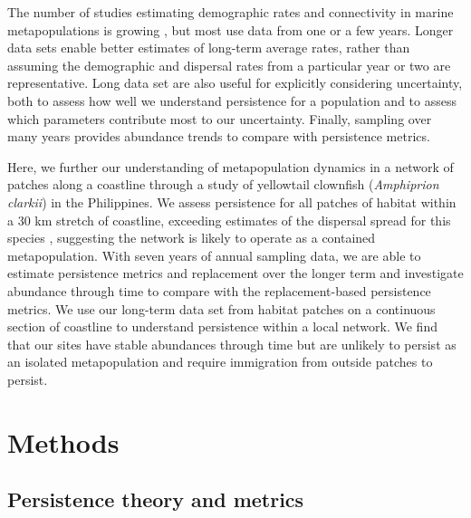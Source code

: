 \documentclass[12pt, oneside]{article}   	%
\begin{document}
The number of studies estimating demographic rates and connectivity in marine metapopulations is growing \citep[e.g.][]{carson2011evaluating, salles_coral_2015, johnson2018integrating, garavelli2018population}, but most use data from one or a few years. Longer data sets enable better estimates of long-term average rates, rather than assuming the demographic and dispersal rates from a particular year or two are representative. Long data set are also useful for explicitly considering uncertainty, both to assess how well we understand persistence for a population and to assess which parameters contribute most to our uncertainty. Finally, sampling over many years provides abundance trends to compare with persistence metrics.


Here, we further our understanding of metapopulation dynamics in a network of patches along a coastline through a study of yellowtail clownfish (\textit{Amphiprion clarkii}) in the Philippines. We assess persistence for all patches of habitat within a 30 km stretch of coastline, exceeding estimates of the dispersal spread for this species \citep{pinsky2010using}, suggesting the network is likely to operate as a contained metapopulation. With seven years of annual sampling data, we are able to estimate persistence metrics and replacement over the longer term and investigate abundance through time to compare with the replacement-based persistence metrics. We use our long-term data set from habitat patches on a continuous section of coastline to understand persistence within a local network. We find that our sites have stable abundances through time but are unlikely to persist as an isolated metapopulation and require immigration from outside patches to persist.%

\section*{Methods} 

\subsection*{Persistence theory and metrics}
\end{document}
